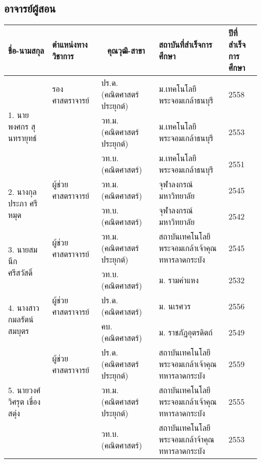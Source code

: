 \subsection*{อาจารย์ผู้สอน}
\begin{center}
	{\footnotesize     
		\begin{longtable}{|p{}|p{}|p{}|p{}|p{}|}
			\hline
			\multicolumn{1}{|c|}{\textbf{ชื่อ-นามสกุล}} & \textbf{ตำแหน่งทางวิชาการ} & \multicolumn{1}{c|}{\textbf{คุณวุฒิ-สาขา}}               & \textbf{สถาบันที่สำเร็จการศึกษา}               & \textbf{ปีที่สำเร็จการศึกษา} \\ \hline
			
			\endhead
		\multirow{3}{*}{1. นายพงศกร สุนทรายุทธ์}
				&รองศาสตราจารย์	&ปร.ด.(คณิตศาสตร์ประยุกต์) &ม.เทคโนโลยีพระจอมเกล้าธนบุรี&2558\\
				\cline{3-5}
				&&วท.ม. (คณิตศาสตร์ประยุกต์)&ม.เทคโนโลยีพระจอมเกล้าธนบุรี&2553\\
				\cline{3-5}
				&& วท.บ. (คณิตศาสตร์)&ม.เทคโนโลยีพระจอมเกล้าธนบุรี&2551\\
				\hline
		
		
		\multirow{2}{*}{2. นางกุลประภา ศรีหมุด}
				&ผู้ช่วยศาสตราจารย์&วท.ม. (คณิตศาสตร์)&จุฬาลงกรณ์มหาวิทยาลัย&2545\\	\cline{3-5}
				&&วท.บ. (คณิตศาสตร์)&จุฬาลงกรณ์มหาวิทยาลัย&2542\\	
				\hline
				
		
		\multirow{2}{*}{3. นายสมนึก ศรีสวัสดิ์}
				&ผู้ช่วยศาสตราจารย์& วท.ม. (คณิตศาสตร์ประยุกต์)&สถาบันเทคโนโลยีพระจอมเกล้าเจ้าคุณทหารลาดกระบัง&2545\\
				\cline{3-5}
				&&วท.บ. (คณิตศาสตร์)&ม. รามคำแหง&2532\\
				\hline
				
				
		\multirow{2}{*}{4. นางสาวกมลรัตน์ สมบุตร}
				&ผู้ช่วยศาสตราจารย์&ปร.ด. (คณิตศาสตร์)&ม. นเรศวร&2556\\
				\cline{3-5}
				&&คบ. (คณิตศาสตร์)&ม. ราชภัฏอุตรดิตถ์&2549\\
				\hline
				
				
		\multirow{3}{*}{5. นายวงศ์วิศรุต เขื่องสตุ่ง}
				&ผู้ช่วยศาสตราจารย์&ปร.ด. (คณิตศาสตร์ประยุกต์)&สถาบันเทคโนโลยีพระจอมเกล้าเจ้าคุณทหารลาดกระบัง&2559\\
				\cline{3-5}
				
				&&วท.ม. (คณิตศาสตร์ประยุกต์)&สถาบันเทคโนโลยีพระจอมเกล้าเจ้าคุณทหารลาดกระบัง&2555\\
				\cline{3-5}
				&& วท.บ. (คณิตศาสตร์)&สถาบันเทคโนโลยีพระจอมเกล้าจ้าคุณทหารลาดกระบัง&2553\\
					\hline
					

\end{longtable}}
\end{center}
